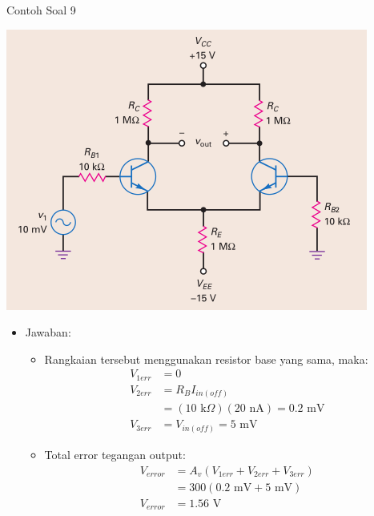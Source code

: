 \documentclass[aspectratio=169]{beamer}
\begin{document}
\begin{frame}{Contoh Soal 9}
	\begin{multicols}{2}
		\begin{center}
			\includegraphics[height=0.7\textheight]{gambar/01.diff-amp/01.contoh_soal_9}
		\end{center}
		\columnbreak
		\begin{itemize}
			\item Jawaban:
			\begin{itemize}
				\item Rangkaian tersebut menggunakan resistor base yang sama, maka:
				\begin{align*}
					V_{1err} &= 0 \\
					V_{2err} &= R_{B}I_{in(off)} \\
					&= (10 \text{ k}\Omega)(20 \text{ nA}) = 0.2 \text{ mV} \\
					V_{3err} &= V_{in(off)} = 5 \text{ mV}
				\end{align*}
			\item Total error tegangan output:
			\begin{align*}
				V_{error} &= A_v (V_{1err} + V_{2err} + V_{3err}) \\
				&= 300 (0.2 \text{ mV} + 5 \text{ mV}) \\
				V_{error} &= 1.56 \text{ V}
			\end{align*}
			\end{itemize}
		\end{itemize}
	\end{multicols}
\end{frame}
\end{document}
